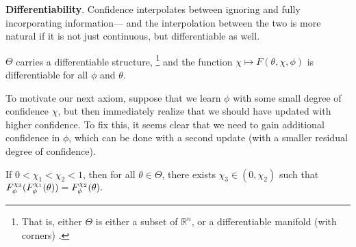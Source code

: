\textbf{Differentiability}.
Confidence interpolates between ignoring and fully incorporating information---
and the interpolation between the two is more natural if it is not just 
continuous, but differentiable as well.

\begin{CFaxioms}
	\item \label{ax:diffble}
	$\Theta$
	carries a differentiable structure,
	\unskip\footnote{
		That is, either 
		$\Theta$ is either a subset of $\mathbb R^n$,
	 	or a differentiable manifold (with corners) 
		\parencite{lee2013smooth,joyce2009manifolds-w/corners}.}
	and  
	the function $\chi \mapsto F(\theta,\chi,\phi)$
	is differentiable
	for all $\phi$ and $\theta$.
\end{CFaxioms}

To motivate our next axiom,
suppose that we learn $\phi$ with some small degree of confidence $\chi$,
but then immediately realize that we should have updated with higher confidence. 
To fix this, it seems clear that we need to gain additional confidence
in $\phi$, which can be done with a second update 
(with a smaller residual degree of confidence).

\begin{CFaxioms}
	\item 
	If $0 < \chi_1 < \chi_2 < 1$, 
	then for all $\theta \in \Theta$, 
	there exists 
	$\chi_3 \in (0,\chi_2)$
	such that
	$
	F_\phi^{
	\chi_{3}
	}(F_\phi^{\chi_1}(\theta)) = F_\phi^{\chi_2}(\theta).
	$
	\label{ax:seq-for-more}
\end{CFaxioms}

